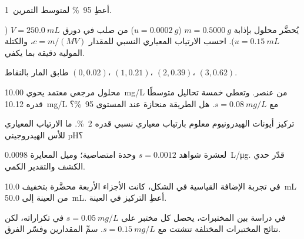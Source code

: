 \begin{exercise}[$\star$]\label{exo:b2:measurement-statistics:2}
أعطِ  95~\% لمتوسط التمرين~1.
\end{exercise}

\begin{exercise}[$\star$]\label{exo:b2:measurement-statistics:3}
يُحضَّر محلول بإذابة $m = \qty{0.5000}{g}$ ($u = \qty{0.0002}{g}$) من صلب في دورق
$V = \qty{250.0}{mL}$ ($u = \qty{0.15}{mL}$). احسب الارتياب المعياري النسبي للمقدار $c = m/(MV)$،
والكتلة المولية دقيقة بما يكفي.
\end{exercise}

\begin{exercise}[$\star$]\label{exo:b2:measurement-statistics:4}
طابق  المار بالنقاط $(0, 0.02)$، $(1, 0.21)$، $(2, 0.39)$، $(3, 0.62)$.
\end{exercise}

\begin{exercise}[$\star\star$]\label{exo:b2:measurement-statistics:5}
محلول مرجعي معتمد يحوي \qty{10.00}{mg/L} من عنصر. وتعطي خمسة تحاليل متوسطًا قدره
\qty{10.12}{mg/L} مع $s = \qty{0.08}{mg/L}$. هل الطريقة منحازة عند المستوى 95~\%؟
\end{exercise}

\begin{exercise}[$\star\star$]\label{exo:b2:measurement-statistics:6}
تركيز أيونات الهيدرونيوم معلوم بارتياب معياري نسبي قدره 2~\%. ما
الارتياب المعياري للأس الهيدروجيني pH؟
\end{exercise}

\begin{exercise}[$\star\star$]\label{exo:b2:measurement-statistics:7}
لعشرة شواهد $s = 0.0012$ وحدة امتصاصية؛ وميل المعايرة \qty{0.0098}{L/\micro g}.
قدّر حدي الكشف والتقدير الكمي.
\end{exercise}

\begin{exercise}[$\star\star$]\label{exo:b2:measurement-statistics:8}
في تجربة الإضافة القياسية في الشكل، كانت الأجزاء الأربعة محضَّرة بتخفيف
\qty{10.0}{mL} من العينة إلى \qty{50.0}{mL}. أعطِ التركيز في العينة.
\end{exercise}

\begin{exercise}[$\star\star$]\label{exo:b2:measurement-statistics:9}
في دراسة بين المختبرات، يحصل كل مختبر على $s = \qty{0.05}{mg/L}$ في تكراراته، لكن
نتائج المختبرات المختلفة تتشتت مع $s = \qty{0.15}{mg/L}$. سمِّ المقدارين 
وفسّر الفرق.
\end{exercise}

